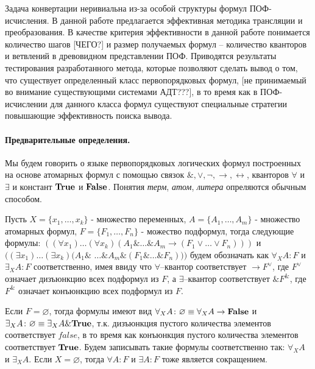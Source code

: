 \documentclass[a4paper]{jctart15b}
\begin{document}
Задача конвертации неривиальна из-за особой структуры формул ПОФ-исчисления. В
данной работе предлагается эффективная методика трансляции и преобразования.  В
качестве критерия эффективности в данной работе понимается количество шагов
[ЧЕГО?] и размер получаемых формул -- количество кванторов и ветвлений в древовидном представлении ПОФ. Приводятся результаты тестирования разработанного метода, которые позволяют сделать вывод о том, что существует определенный класс первопорядковых формул, [не принимаемый во внимание существующими системами АДТ???], в то время как в ПОФ-исчислении для данного класса формул существуют специальные стратегии повышающие эффективность поиска вывода.

\paragraph{Предварительные определения.}

Мы будем говорить о языке первопорядковых логических формул построенных на основе атомарных формул с помощью связок  $\&, \vee, \neg, \rightarrow, \leftrightarrow$, кванторов $\forall$ и $\exists$ и констант $\text{\textbf{True}}$ и $\text{\textbf{False}}$. Понятия \emph{терм}, \emph{атом}, \emph{литера} опреляются обычным способом.

Пусть $X = \{x_1,\ldots,x_k\}$ - множество переменных, $A = \{A_1,\ldots,A_m\}$ - множество атомарных формул, $F = \{F_1,\ldots,F_n\}$ - можество подформул, тогда следующие формулы: $((\forall x_1) \ldots (\forall x_k) (A_1 \& \ldots \& A_m \rightarrow (F_1 \vee \ldots \vee F_n)))$ и $((\exists x_1) \ldots (\exists x_k) (A_1 \&$ $\ldots \& A_m \& (F_1 \& \ldots \& F_n)))$ будем обозначать как $\forall_XA\colon F$ и $\exists_XA\colon F$ соответственно, имея ввиду что $\forall$--квантор соответствует $\rightarrow F^{\vee}$, где $F^{\vee}$ означает дизъюнкцию всех подформул из $F$, а $\exists$--квантор соответствует $\& F^{\&}$, где $F^{\&}$ означает конъюнкцию всех подформул из $F$.

Если $F = \varnothing$, тогда формулы имеют вид $\forall_XA\colon\varnothing \equiv \forall_XA \rightarrow \text{\textbf{False}}$ и $\exists_XA\colon\varnothing \equiv \exists_XA \& \text{\textbf{True}}$, т.к. дизъюнкция пустого количества элементов соответствует $false$, в то время как конъюнкция пустого количества элементов соответствует $\text{\textbf{True}}$. Будем записывать такие формулы соответственно так: $\forall_XA$ и $\exists_XA$. Если $X = \varnothing$, тогда $\forall A\colon F$ и $\exists A\colon F$ тоже является сокращением.
\end{document}
